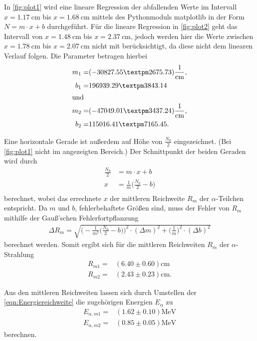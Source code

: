 In \autoref{fig:plot1} wird eine lineare Regression der abfallenden Werte im Intervall $x=\qty{1.17}{\centi\meter}$ bis $x=\qty{1.68}{\centi\meter}$
mittels des Pythonmoduls matplotlib \cite{matplotlib} in der Form $N=m \cdot x +b$ durchgeführt.
Für die lineare Regression in \autoref{fig:plot2} geht das Intervall von $x=\qty{1.48}{\centi\meter}$ bis $x=\qty{2.37}{\centi\meter}$, jedoch 
werden hier die Werte zwischen $x=\qty{1.78}{\centi\meter}$ bis $x=\qty{2.07}{\centi\meter}$ nicht mit berücksichtigt, da diese nicht dem
linearen Verlauf folgen.
Die Parameter betragen hierbei
\begin{align*}
m_1 =& (-30827.55 ± 2675.73) \si{\per\centi\meter},\\
b_1 =& 196939.29 ± 3843.14\\
\shortintertext{und}
m_2 =& (-47049.01 ± 3437.24) \si{\per\centi\meter},\\
b_2 =& 115016.41 ± 7165.45.
\end{align*}

Eine horizontale Gerade ist außerdem auf Höhe von $\frac{N_0}{2}$ eingezeichnet. (Bei \autoref{fig:plot1} nicht im angezeigten Bereich.)
Der Schnittpunkt der beiden Geraden wird durch
\begin{align*}
  \frac{N_0}{2} &= m \cdot x + b \\
  x &= \frac{1}{m} \biggl(\frac{N_0}{2} - b \biggr) \\
\end{align*}
berechnet, wobei das errechnete $x$ der mittleren Reichweite $R_m$ der $\alpha$-Teilchen entspricht.
Da $m$ und $b$, fehlerbehaftete Größen sind, muss der Fehler von $R_m$ mithilfe der Gauß'schen Fehlerfortpflanzung
\begin{align*}
  \Delta R_m = \sqrt{\biggl(-\frac{1}{m^2} \biggl( \frac{N_0}{2} - b \biggr)\biggr)^2 \cdot (\Delta m)^2 + \biggl(\frac{1}{m}\biggr)^2 \cdot (\Delta b)^2}
\end{align*}
berechnet werden.
Somit ergibt sich für die mittleren Reichweiten $R_m$ der $\alpha$-Strahlung
\begin{align*}
  R_{m1}=& (6.40 \pm 0.60)\si{\centi\meter}\\
  R_{m2}=& (2.43 \pm 0.23)\si{\centi\meter}.
\end{align*}

Aus den mittleren Reichweiten lassen sich durch Umstellen der \autoref{eqn:Energiereichweite} die zugehörigen Energien $E_{\alpha}$ zu
\begin{align*}
  E_{\alpha, m1}=& (1.62 \pm 0.10)\si{\mega\eV}\\
  E_{\alpha, m2}=& (0.85 \pm 0.05)\si{\mega\eV}
\end{align*}
berechnen.

